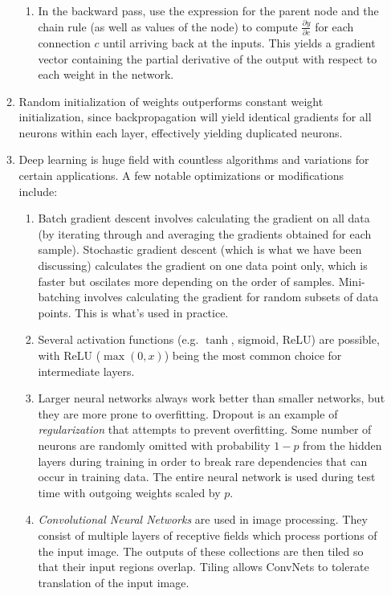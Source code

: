 \documentclass[10pt]{article}
\begin{document}
\begin{multicols}{2}
\begin{enumerate}
\begin{enumerate}
\begin{enumerate}
            \item In the backward pass, use the expression for the parent node and the chain rule (as well as values of the node) to compute $\frac{\partial y}{\partial c}$ for each connection $c$ until arriving back at the inputs. This yields a gradient vector containing the partial derivative of the output with respect to each weight in the network.
        \end{enumerate}
        \item Random initialization of weights outperforms constant weight initialization, since backpropagation will yield identical gradients for all neurons within each layer, effectively yielding duplicated neurons.
        \item Deep learning is huge field with countless algorithms and variations for certain applications. A few notable optimizations or modifications include:
        \begin{enumerate}
        \item Batch gradient descent involves calculating the gradient on all data (by iterating through and averaging the gradients obtained for each sample). Stochastic gradient descent (which is what we have been discussing) calculates the gradient on one data point only, which is faster but oscilates more depending on the order of samples. Mini-batching involves calculating the gradient for random subsets of data points. This is what's used in practice.
        \item Several activation functions (e.g. $\tanh$, sigmoid, ReLU) are possible, with ReLU ($\max(0,x)$) being the most common choice for intermediate layers.
        \item Larger neural networks always  work better than smaller networks, but they are more prone to overfitting. Dropout is an example of \textit{regularization} that attempts to prevent overfitting. Some number of neurons are randomly omitted with probability $1-p$ from the hidden layers during training in order to break rare dependencies that can occur in training data. The entire neural network is used during test time with outgoing weights scaled by $p$.
        \item \textit{Convolutional Neural Networks} are used in image processing. They consist of multiple layers of receptive fields which process portions of the input image. The outputs of these collections are then tiled so that their input regions overlap. Tiling allows ConvNets to tolerate translation of the input image.
        \end{enumerate}
    \end{enumerate}
\end{enumerate}

\end{multicols}
\end{document}
